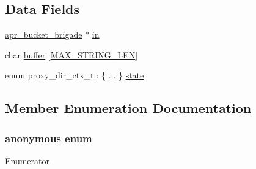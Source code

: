 \subsection*{Data Fields}
\begin{DoxyCompactItemize}
\item 
\hyperlink{structapr__bucket__brigade}{apr\+\_\+bucket\+\_\+brigade} $\ast$ \hyperlink{structproxy__dir__ctx__t_a935dc3589fcc530d8ef4fed3af8381d5}{in}
\item 
char \hyperlink{structproxy__dir__ctx__t_a73d3948ed8e032d421c0b517f7f2400d}{buffer} \mbox{[}\hyperlink{passwd__common_8h_a4fa9aad0e9c7cc2e344b679cdbb2b67d}{M\+A\+X\+\_\+\+S\+T\+R\+I\+N\+G\+\_\+\+L\+EN}\mbox{]}
\item 
enum proxy\+\_\+dir\+\_\+ctx\+\_\+t\+:: \{ ... \}  \hyperlink{structproxy__dir__ctx__t_a957051b07a6f492736a5bd028e949d4e}{state}
\end{DoxyCompactItemize}


\subsection{Member Enumeration Documentation}
\subsubsection[{\texorpdfstring{anonymous enum}{anonymous enum}}]{\setlength{\rightskip}{0pt plus 5cm}anonymous enum}\hypertarget{structproxy__dir__ctx__t_aa2926737f6993b3002d021e881b105d5}{}\label{structproxy__dir__ctx__t_aa2926737f6993b3002d021e881b105d5}
\begin{Desc}
\item[Enumerator]\par
\begin{description}
\item[{\em 
H\+E\+A\+D\+ER\hypertarget{structproxy__dir__ctx__t_aa2926737f6993b3002d021e881b105d5a8c44afff6acf5e1e091f628b5811998d}{}\label{structproxy__dir__ctx__t_aa2926737f6993b3002d021e881b105d5a8c44afff6acf5e1e091f628b5811998d}
}]\item[{\em 
B\+O\+DY\hypertarget{structproxy__dir__ctx__t_aa2926737f6993b3002d021e881b105d5aa58184ef41f4e03de3b4e8f26ca2d51a}{}\label{structproxy__dir__ctx__t_aa2926737f6993b3002d021e881b105d5aa58184ef41f4e03de3b4e8f26ca2d51a}
}]\item[{\em 
F\+O\+O\+T\+ER\hypertarget{structproxy__dir__ctx__t_aa2926737f6993b3002d021e881b105d5a9f18bcb4ea8f1ddc933808b9024dacd3}{}\label{structproxy__dir__ctx__t_aa2926737f6993b3002d021e881b105d5a9f18bcb4ea8f1ddc933808b9024dacd3}
}]\end{description}
\end{Desc}

